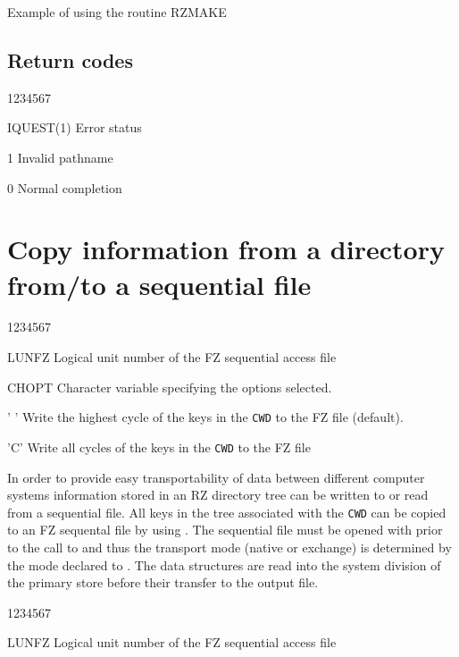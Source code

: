 \begin{XMPt}{Example of using the routine RZMAKE}
\subsection{Return codes}
\begin{DLtt}{1234567}
\item[IQUEST(1)]Error status
\begin{DLtt}{12}
\item[1]Invalid pathname
\item[0]Normal completion
\end{DLtt}
\end{DLtt}
\section{Copy information from a directory from/to a sequential file}
\Idesc
\begin{DLtt}{1234567}
\item[LUNFZ]Logical unit number of the FZ sequential access file
\item[CHOPT]Character variable specifying the options selected.
\begin{DLtt}{12}
\item[' ']Write the highest cycle of the keys in the {\tt CWD}
to the FZ file (default).
\item['C']Write all cycles of the keys in the {\tt CWD} to the FZ file
\end{DLtt}
\end{DLtt}
\par 
In order to provide
easy transportability of data between different computer
systems information stored in an RZ directory tree can
be written to or read from a sequential file.
All keys in the tree associated with the {\tt CWD} can be copied
to an FZ sequental file by using .
The sequential file must be opened with  prior to
the call to  and thus the transport mode (native or exchange)
is determined by the mode declared to .
The data structures are read into the system division of the
primary store before their transfer to the output file.
\Idesc
\begin{DLtt}{1234567}
\item[LUNFZ]Logical unit number of the FZ sequential access file

\end{DLtt}
\end{XMPt}
